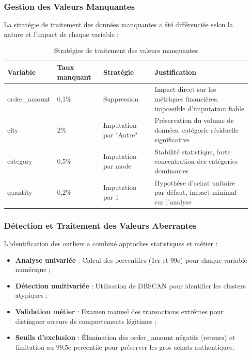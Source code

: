 \documentclass[a4paper,12pt]{article}
\begin{document}
\subsubsection{Gestion des Valeurs Manquantes}
La stratégie de traitement des données manquantes a été différenciée selon la nature et l'impact de chaque variable :

\begin{table}[H]
\centering
\begin{tabular}{|l|l|l|p{6cm}|}
\hline
\textbf{Variable} & \textbf{Taux manquant} & \textbf{Stratégie} & \textbf{Justification} \\
\hline
order\_amount & 0,1\% & Suppression & Impact direct sur les métriques financières, impossible d'imputation fiable \\
\hline
city & 2\% & Imputation par "Autre" & Préservation du volume de données, catégorie résiduelle significative \\
\hline
category & 0,5\% & Imputation par mode & Stabilité statistique, forte concentration des catégories dominantes \\
\hline
quantity & 0,2\% & Imputation par 1 & Hypothèse d'achat unitaire par défaut, impact minimal sur l'analyse \\
\hline
\end{tabular}
\caption{Stratégies de traitement des valeurs manquantes}
\label{tab:strategie_manquantes}
\end{table}

\subsubsection{Détection et Traitement des Valeurs Aberrantes}
L'identification des outliers a combiné approches statistiques et métier :

\begin{itemize}
    \item \textbf{Analyse univariée} : Calcul des percentiles (1er et 99e) pour chaque variable numérique ;
    \item \textbf{Détection multivariée} : Utilisation de DBSCAN pour identifier les clusters atypiques ;
    \item \textbf{Validation métier} : Examen manuel des transactions extrêmes pour distinguer erreurs de comportements légitimes ;
    \item \textbf{Seuils d'exclusion} : Élimination des order\_amount négatifs (retours) et limitation au 99,5e percentile pour préserver les gros achats authentiques.
\end{itemize}
\end{document}

